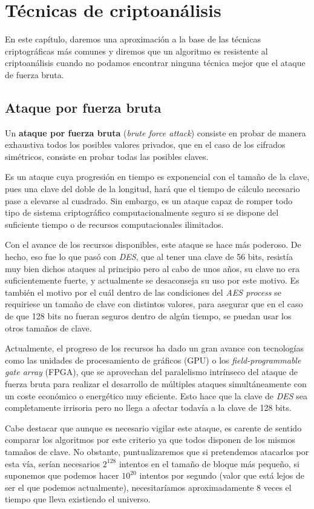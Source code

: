 \chapter{Técnicas de criptoanálisis}
\label{chp:crypto}
En este capítulo, daremos una aproximación a la base de las técnicas criptográficas más comunes y diremos que un algoritmo es resistente al criptoanálisis cuando no podamos encontrar ninguna técnica mejor que el ataque de fuerza bruta.

\section{Ataque por fuerza bruta}
\label{sec:bruteforce}
Un \textbf{ataque por fuerza bruta} (\textit{brute force attack}) consiste en probar de manera exhaustiva todos los posibles valores privados, que en el caso de los cifrados simétricos, consiste en probar todas las posibles claves.

Es un ataque cuya progresión en tiempo es exponencial con el tamaño de la clave, pues una clave del doble de la longitud, hará que el tiempo de cálculo necesario pase a elevarse al cuadrado. Sin embargo, es un ataque capaz de romper todo tipo de sistema criptográfico computacionalmente seguro si se dispone del suficiente tiempo o de recursos computacionales ilimitados.

Con el avance de los recursos disponibles, este ataque se hace más poderoso. De hecho, eso fue lo que pasó con \textit{DES}, que al tener una clave de 56 bits, resistía muy bien dichos ataques al principio pero al cabo de unos años, su clave no era suficientemente fuerte, y actualmente se desaconseja su uso por este motivo. Es también el motivo por el cuál dentro de las condiciones del \textit{AES process} se requiriese un tamaño de clave con distintos valores, para asegurar que en el caso de que 128 bits no fueran seguros dentro de algún tiempo, se puedan usar los otros tamaños de clave.

Actualmente, el progreso de los recursos ha dado un gran avance con tecnologías como las unidades de procesamiento de gráficos (GPU) o los \textit{field-programmable gate array} (FPGA), que se aprovechan del paralelismo intrínseco del ataque de fuerza bruta para realizar el desarrollo de múltiples ataques simultáneamente con un coste económico o energético muy eficiente. Esto hace que la clave de \textit{DES} sea completamente irrisoria pero no llega a afectar todavía a la clave de 128 bits.

Cabe destacar que aunque es necesario vigilar este ataque, es carente de sentido comparar los algoritmos por este criterio ya que todos disponen de los mismos tamaños de clave. No obstante, puntualizaremos que si pretendemos atacarlos por esta vía, serían necesarios $2^{128}$ intentos en el tamaño de bloque más pequeño, si suponemos que podemos hacer $10^{20}$ intentos por segundo (valor que está lejos de ser el que podemos actualmente), necesitaríamos aproximadamente 8 veces el tiempo que lleva existiendo el universo.

